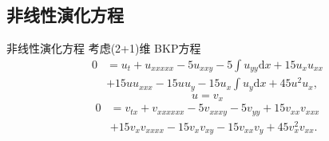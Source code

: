 \documentclass[handout]{beamer}
\newcommand{\dd}[1]{\mathrm{d}#1}
\begin{document}
\subsection{非线性演化方程}
\begin{frame}{非线性演化方程}
考虑(2+1)维 BKP方程
\begin{equation}
\begin{aligned}
0&=u_t+u_{xxxxx}-5u_{xxy}-5\int{u_{yy}\dd{x}}+15u_xu_{xx}\\
&+15uu_{xxx}-15uu_y-15u_x\int{u_y\dd{x}}+45u^2u_x, \label{BKP}
\end{aligned}
\end{equation}
\pause 
\begin{equation*}
  u=v_x
\end{equation*}
\pause 
\begin{equation}
\begin{aligned}
0&=v_{tx}+v_{xxxxxx}-5v_{xxxy}-5v_{yy}+15v_{xx}v_{xxx}\\
&+15v_xv_{xxxx}-15v_xv_{xy}-15v_{xx}v_y+45v_x^2v_{xx}. 
\end{aligned}
\end{equation}
\end{frame}
\end{document}
